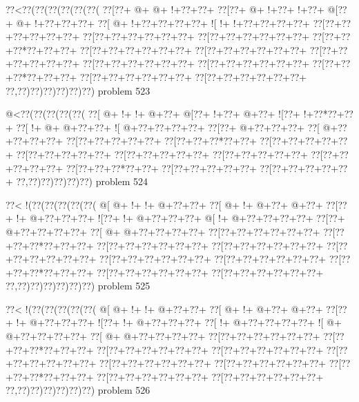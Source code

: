\vbox{\vbox{\goo
\0??<\0??(\0??(\0??(\0??(\0??(\0??(
\0??[\0??+\- @+\- @+\- !+\0??+\0??+
\0??[\0??+\- @+\- !+\0??+\- !+\0??+
\- @[\0??+\- @+\- !+\0??+\0??+\0??+
\0??[\- @+\- !+\0??+\0??+\0??+\0??+
\- ![\- !+\- !+\0??+\0??+\0??+\0??+
\0??[\0??+\0??+\0??+\0??+\0??+\0??+
\0??[\0??+\0??+\0??+\0??+\0??+\0??+
\0??[\0??+\0??+\0??+\0??+\0??+\0??+
\0??[\0??+\0??+\0??*\0??+\0??+\0??+
\0??[\0??+\0??+\0??+\0??+\0??+\0??+
\0??[\0??+\0??+\0??+\0??+\0??+\0??+
\0??[\0??+\0??+\0??+\0??+\0??+\0??+
\0??[\0??+\0??+\0??+\0??+\0??+\0??+
\0??[\0??+\0??+\0??+\0??+\0??+\0??+
\0??[\0??+\0??+\0??*\0??+\0??+\0??+
\0??[\0??+\0??+\0??+\0??+\0??+\0??+
\0??[\0??+\0??+\0??+\0??+\0??+\0??+
\0??,\0??)\0??)\0??)\0??)\0??)\0??)
}
\hfil problem 523\hfil\break
}

\vbox{\vbox{\goo
\- @<\0??(\0??(\0??(\0??(\0??(
\0??[\- @+\- !+\- !+\- @+\0??+
\- @[\0??+\- !+\0??+\- @+\0??+
\- ![\0??+\- !+\0??*\0??+\0??+
\0??[\- !+\- @+\- @+\0??+\0??+
\- ![\- @+\0??+\0??+\0??+\0??+
\0??[\0??+\- @+\0??+\0??+\0??+
\0??[\- @+\0??+\0??+\0??+\0??+
\0??[\0??+\0??+\0??+\0??+\0??+
\0??[\0??+\0??+\0??*\0??+\0??+
\0??[\0??+\0??+\0??+\0??+\0??+
\0??[\0??+\0??+\0??+\0??+\0??+
\0??[\0??+\0??+\0??+\0??+\0??+
\0??[\0??+\0??+\0??+\0??+\0??+
\0??[\0??+\0??+\0??+\0??+\0??+
\0??[\0??+\0??+\0??*\0??+\0??+
\0??[\0??+\0??+\0??+\0??+\0??+
\0??[\0??+\0??+\0??+\0??+\0??+
\0??,\0??)\0??)\0??)\0??)\0??)
}
\hfil problem 524\hfil\break
}

\vbox{\vbox{\goo
\0??<\- !(\0??(\0??(\0??(\0??(\0??(
\- @[\- @+\- !+\- !+\- @+\0??+\0??+
\0??[\- @+\- !+\- @+\0??+\- @+\0??+
\0??[\0??+\- !+\- @+\0??+\0??+\0??+
\- ![\0??+\- !+\- @+\0??+\0??+\0??+
\- @[\- !+\- @+\0??+\0??+\0??+\0??+
\0??[\0??+\- @+\0??+\0??+\0??+\0??+
\0??[\- @+\- @+\0??+\0??+\0??+\0??+
\0??[\0??+\0??+\0??+\0??+\0??+\0??+
\0??[\0??+\0??+\0??*\0??+\0??+\0??+
\0??[\0??+\0??+\0??+\0??+\0??+\0??+
\0??[\0??+\0??+\0??+\0??+\0??+\0??+
\0??[\0??+\0??+\0??+\0??+\0??+\0??+
\0??[\0??+\0??+\0??+\0??+\0??+\0??+
\0??[\0??+\0??+\0??+\0??+\0??+\0??+
\0??[\0??+\0??+\0??*\0??+\0??+\0??+
\0??[\0??+\0??+\0??+\0??+\0??+\0??+
\0??[\0??+\0??+\0??+\0??+\0??+\0??+
\0??,\0??)\0??)\0??)\0??)\0??)\0??)
}
\hfil problem 525\hfil\break
}

\vbox{\vbox{\goo
\0??<\- !(\0??(\0??(\0??(\0??(\0??(
\- @[\- @+\- !+\- !+\- @+\0??+\0??+
\0??[\- @+\- !+\- @+\0??+\- @+\0??+
\0??[\0??+\- !+\- @+\0??+\0??+\0??+
\- ![\0??+\- !+\- @+\0??+\0??+\0??+
\0??[\- !+\- @+\0??+\0??+\0??+\0??+
\- ![\- @+\- @+\0??+\0??+\0??+\0??+
\0??[\- @+\- @+\0??+\0??+\0??+\0??+
\0??[\0??+\0??+\0??+\0??+\0??+\0??+
\0??[\0??+\0??+\0??*\0??+\0??+\0??+
\0??[\0??+\0??+\0??+\0??+\0??+\0??+
\0??[\0??+\0??+\0??+\0??+\0??+\0??+
\0??[\0??+\0??+\0??+\0??+\0??+\0??+
\0??[\0??+\0??+\0??+\0??+\0??+\0??+
\0??[\0??+\0??+\0??+\0??+\0??+\0??+
\0??[\0??+\0??+\0??*\0??+\0??+\0??+
\0??[\0??+\0??+\0??+\0??+\0??+\0??+
\0??[\0??+\0??+\0??+\0??+\0??+\0??+
\0??,\0??)\0??)\0??)\0??)\0??)\0??)
}
\hfil problem 526\hfil\break
}

